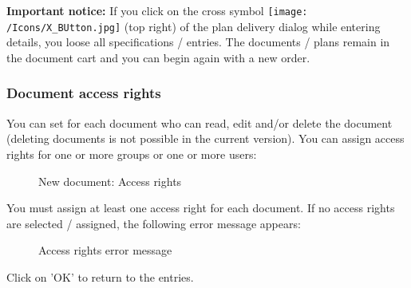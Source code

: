 \textbf{Important notice:} If you click on the cross symbol \texttt{[image: /Icons/X\_BUtton.jpg]} (top right) of the plan delivery dialog while entering details, you loose all specifications / entries. The documents / plans remain in the document cart and you can begin again with a new order.


\subsubsection{Document access rights}
\label{bkm:Ref442869495}

You can set for each document who can read, edit and/or delete the document (deleting documents is not possible in the current version). You can assign access rights for one or more groups or one or more users:

\begin{figure}[H]
\caption{New document: Access rights}
\end{figure}

You must assign at least one access right for each document. If no access rights are selected / assigned, the following error message appears:

\begin{figure}[H]
\caption{Access rights error message}
\end{figure}

Click on 'OK' to return to the entries. 

\vspace{\baselineskip}

